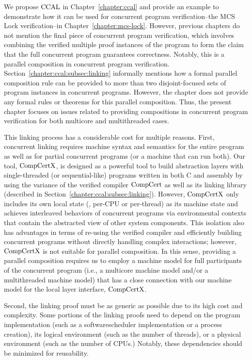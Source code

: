  We propose $\mathrm{CCAL}$ in Chapter~\ref{chapter:ccal} and
provide an example to demonstrate how it can be used for concurrent program verification--the MCS Lock verification--in Chapter~\ref{chapter:mcs-lock}.
However, previous chapters do not mention the final piece of concurrent program verification, 
which involves combining the verified multiple proof instances of the program to form the claim that the full concurrent program guarantees correctness. Notably, this is a parallel composition in concurrent program verification. 
Section~\ref{chapter:ccal:subsec:linking}
informally mentions how a formal parallel composition rule can be provided to more than two disjoint-focused sets of program instances in concurrent programs.
However, the chapter does not provide any formal rules or theorems for this parallel composition. 
Thus, the present chapter focuses on issues related to providing compositions in concurrent program verification for both multicore and multithreaded cases.


This linking process has a considerable cost for multiple reasons. 
First, concurrent linking requires machine syntax and semantics for the entire program as well as for partial concurrent programs 
(or a machine that can run both). 
Our tool, $\mathrm{CompCertX}$, is designed as a powerful tool to build abstraction layers with single-threaded (or sequential-like) programs written in both C and assembly by using the variance of the verified compiler $\mathrm{CompCert}$ as well as its linking library (described in Section~\ref{chapter:ccal:subsec:linking}). However, $\mathrm{CompCertX}$ only includes its own local state (\ie, per-CPU or per-thread) as its machine state and achieves interleaved behaviors of concurrent programs via environmental contexts that contain the abstracted view of other system components. 
This isolation also has advantages in terms of re-using the verified compiler and efficiently building concurrent programs without directly handling complex interactions; however, $\mathrm{CompCertX}$ is not suitable for parallel composition. 
In this sense, providing a parallel composition requires us to employ a machine model for full participants of the concurrent program (i.e., a multicore machine model and/or a multithreaded machine model) that has a close connection with our machine model for the local layer interface, $\mathrm{CompCertX}$.

Second, the linking proof must be as generic as possible due to its high cost and complexity.
Some portions of the linking proofs need to depend on the program implementation (such as a softwarescheduler implementation or a process creation), its logical environment (such as the number of threads), or a physical environment (such as the number of CPUs.) 
Notably, these dependencies should be minimized for reusability.

